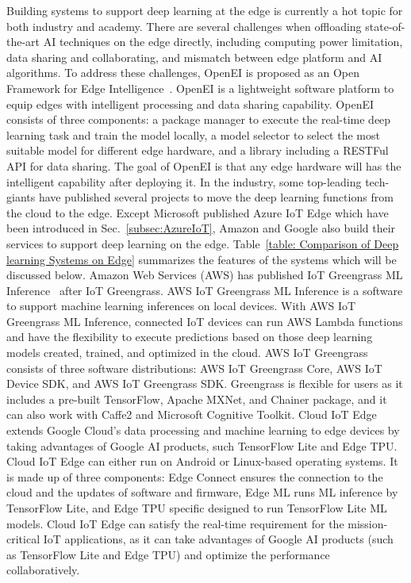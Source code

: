 Building systems to support deep learning at the edge is currently a hot topic for both industry and academy. There are several challenges when offloading state-of-the-art AI techniques on the edge directly, including computing power limitation, data sharing and collaborating, and mismatch between edge platform and AI algorithms. To address these challenges, OpenEI is proposed as an Open Framework for Edge Intelligence~. OpenEI is a lightweight software platform to equip edges with intelligent processing and data sharing capability. OpenEI consists of three components: a package manager to execute the real-time deep learning task and train the model locally, a model selector to select the most suitable model for different edge hardware, and a library including a RESTFul API for data sharing. The goal of OpenEI is that any edge hardware will has the intelligent capability after deploying it. 
In the industry, some top-leading tech-giants have published several projects to move the deep learning functions from the cloud to the edge. Except Microsoft published Azure IoT Edge which have been introduced in Sec.~\ref{subsec:AzureIoT}, Amazon and Google also build their services to support deep learning on the edge.
Table~\ref{table: Comparison of Deep learning Systems on Edge} summarizes the features of the systems which will be discussed below.
Amazon Web Services (AWS) has published IoT Greengrass ML Inference~ after IoT Greengrass. AWS IoT Greengrass ML Inference is a software to support machine learning inferences on local devices. With AWS IoT Greengrass ML Inference, connected IoT devices can run AWS Lambda functions and have the flexibility to execute predictions based on those deep learning models created, trained, and optimized in the cloud. AWS IoT Greengrass consists of three software distributions: AWS IoT Greengrass Core, AWS IoT Device SDK, and AWS IoT Greengrass SDK. Greengrass is flexible for users as it includes a pre-built TensorFlow, Apache MXNet, and Chainer package, and it can also work with Caffe2 and Microsoft Cognitive Toolkit. 
Cloud IoT Edge~ extends Google Cloud's data processing and machine learning to edge devices by taking advantages of Google AI products, such TensorFlow Lite and Edge TPU. Cloud IoT Edge can either run on Android or Linux-based operating systems. It is made up of three components: Edge Connect ensures the connection to the cloud and the updates of software and firmware, Edge ML runs ML inference by TensorFlow Lite, and Edge TPU specific designed to run TensorFlow Lite ML models. Cloud IoT Edge can satisfy the real-time requirement for the mission-critical IoT applications, as it can take advantages of Google AI products (such as TensorFlow Lite and Edge TPU) and optimize the performance collaboratively.
